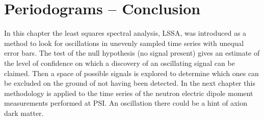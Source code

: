 \section*{Periodograms -- Conclusion}
In this chapter the least squares spectral analysis, LSSA, was introduced as a method to look for oscillations in unevenly sampled time series with unequal error bars.
The test of the null hypothesis (no signal present) gives an estimate of the level of confidence on which a discovery of an oscillating signal can be claimed.
Then a space of possible signals is explored to determine which ones can be excluded on the ground of not having been detected.
In the next chapter this methodology is applied to the time series of the neutron electric dipole moment measurements performed at PSI\@.
An oscillation there could be a hint of axion dark matter.
